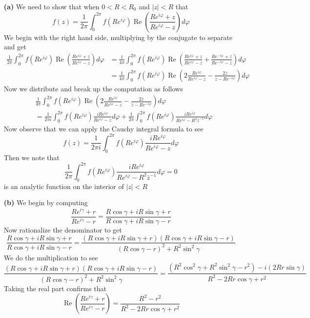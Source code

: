 \documentclass{article}
\newcommand{\real}{\mathrel{\text{Re}}}
\begin{document}
\begin{enumerate}
\item[\textbf{(a)}] We need to show that when $0 < R < R_0$ and $|z| <
  R$ that
\[
f(z) = \frac{1}{2\pi}\int_0^{2\pi}
f(Re^{i\varphi})\real\left(\frac{Re^{i\varphi} +
    z}{Re^{i\varphi}-z}\right)d\varphi
\]
We begin with the right hand side, multiplying by the conjugate to
separate and get
\begin{align*}
  \frac{1}{2\pi}\int_0^{2\pi}
  f(Re^{i\varphi})\real\left(\frac{Re^{i\varphi} +
      z}{Re^{i\varphi}-z}\right)d\varphi &=
  \frac{1}{4\pi}\int_0^{2\pi}
  f(Re^{i\varphi})\real\left(\frac{Re^{i\varphi} + z}{Re^{i\varphi}-z}
    + \frac{Re^{-i\varphi} +
      \bar{z}}{Re^{-i\varphi}-\bar{z}}\right)d\varphi \\
  &= \frac{1}{4\pi}\int_0^{2\pi}
  f(Re^{i\varphi})\real\left(2\frac{Re^{i\varphi}}{Re^{i\varphi}-z} -
    \frac{2\bar{z}}{\bar{z} - Re^{-i\varphi}}\right)d\varphi
\end{align*}
Now we distribute and break up the computation as follows
\begin{align*}
  &\frac{1}{4\pi}\int_0^{2\pi}
  f(Re^{i\varphi})\real\left(2\frac{Re^{i\varphi}}{Re^{i\varphi}-z} -
    \frac{2\bar{z}}{\bar{z} - Re^{-i\varphi}}\right)d\varphi\\ &=
  \frac{1}{2\pi i}\int_0^{2\pi}
  f(Re^{i\varphi})\frac{iRe^{i\varphi}}{Re^{i\varphi}-z}d\varphi +
  \frac{1}{2\pi}\int_0^{2\pi}
  f(Re^{i\varphi})\frac{iRe^{i\varphi}}{Re^{i\varphi} - R^2\bar{z}^{-1}}d\varphi
\end{align*}
Now observe that we can apply the Cauchy integral formula to see
\[
f(z) = \frac{1}{2\pi i}\int_0^{2\pi}
  f(Re^{i\varphi})\frac{iRe^{i\varphi}}{Re^{i\varphi}-z}d\varphi
\]
Then we note that
\[
\frac{1}{2\pi}\int_0^{2\pi}
f(Re^{i\varphi})\frac{iRe^{i\varphi}}{Re^{i\varphi} -
  R^2\bar{z}^{-1}}d\varphi = 0
\]
is an analytic function on the interior of $|z| < R$

\item[\textbf{(b)}] We begin by computing
\[
\frac{Re^{i\gamma}+r}{Re^{i\gamma}-r} = \frac{R\cos\gamma +
  iR\sin\gamma + r}{R\cos\gamma + iR\sin\gamma - r}
\]
Now rationalize the denominator to get
\[
\frac{R\cos\gamma + iR\sin\gamma + r}{R\cos\gamma + iR\sin\gamma - r}
= \frac{(R\cos\gamma + iR\sin\gamma + r)(R\cos\gamma + iR\sin\gamma -
  r)}{(R\cos\gamma - r)^2 + R^2\sin^2\gamma}
\]
We do the multiplication to see
\[
\frac{(R\cos\gamma + iR\sin\gamma + r)(R\cos\gamma + iR\sin\gamma -
  r)}{(R\cos\gamma - r)^2 + R^2\sin^2\gamma} = \frac{(R^2\cos^2\gamma
  + R^2\sin^2\gamma - r^2)-i(2Rr\sin\gamma)}{R^2 -2Rr\cos\gamma + r^2}
\]
Taking the real part confirms that
\[
\real\left(\frac{Re^{i\gamma}+r}{Re^{i\gamma}-r}\right) = \frac{R^2 -
  r^2}{R^2 -2Rr\cos\gamma + r^2}
\]
\end{enumerate}
\end{document}
